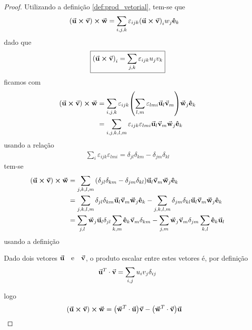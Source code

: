 \documentclass[
  a4paper,
	12pt
]{article}
\begin{document}
\begin{proof}
	Utilizando a definição \ref{def:prod_vetorial}, tem-se que
	\begin{align*}
		\qty(\va{u}\cp\va{v})\cp\va{w} &= \sum_{i,j,k} \varepsilon_{ijk}\qty(\va{u}\cp\va{v})_{i}w_{j}\vu{e}_{k}
	\end{align*}
	dado que
	\begin{align*}
		\boxed{
			\qty(\va{u}\cp\va{v})_{i} = \sum_{j,k} \varepsilon_{ijk}u_{j}v_{k}
		}
	\end{align*}
	ficamos com
	\begin{align*}
		\qty(\va{u}\cp\va{v})\cp\va{w} &= \sum_{i,j,k} \varepsilon_{ijk}\qty(\sum_{l,m} \varepsilon_{lmi}\va{u}_{l}\va{v}_{m})\va{w}_{j}\vu{e}_{k}\\
																	 &=\sum_{i,j,k,l,m} \varepsilon_{ijk} \varepsilon_{lmi}\va{u}_{l}\va{v}_{m}\va{w}_{j}\vu{e}_{k}
	\end{align*}
	usando a relação
	\begin{align*}
		\boxed{
			\sum_{i}\varepsilon_{ijk}\varepsilon_{lmi} = \delta_{jl}\delta_{km}-\delta_{jm}\delta_{kl}	
		}
	\end{align*}
	tem-se
	\begin{align*}
		\qty(\va{u}\cp\va{v})\cp\va{w} &= \sum_{j,k,l,m} \qty(\delta_{jl}\delta_{km}-\delta_{jm}\delta_{kl})\va{u}_{l}\va{v}_{m}\va{w}_{j}\vu{e}_{k}\\
																	 &= \sum_{j,k,l,m} \delta_{jl} \delta_{km}\va{u}_{l}\va{v}_{m}\va{w}_{j}\vu{e}_{k}-\sum_{j,k,l,m} \delta_{jm} \delta_{kl}\va{u}_{l}\va{v}_{m}\va{w}_{j}\vu{e}_{k}\\
																	 &= \sum_{j,l}\va{w}_{j}\va{u}_{l} \delta_{jl}\sum_{k,m}\vu{e}_{k}\va{v}_{m} \delta_{km}-\sum_{j,m}\va{w}_{j}\va{v}_{m} \delta_{jm}\sum_{k,l}\vu{e}_{k}\va{u}_{l}
	\end{align*}
	usando a definição
	\begin{definition}{\label{def:prod_escalar}}
		Dado dois vetores $\va{u}\qq{e}\va{v}$, o produto escalar entre estes vetores é, por definição
		\begin{align}
			\va{u}^{T}\cdot\va{v} = \sum_{i,j}u_{i}v_{j} \delta_{ij}
		\end{align}
	\end{definition}
	logo
	\begin{align*}
		\qty(\va{u}\cp\va{v})\cp\va{w} &= \qty(\va{w}^{T}\cdot\va{u})\va{v}-\qty(\va{w}^{T}\cdot\va{v})\va{u}
	\end{align*}
\end{proof}
\end{document}
